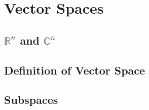 \chapter{Vector Spaces}

\section{$\mathbb{R}^{n}$ and $\mathbb{C}^{n}$}

\section{Definition of Vector Space}

\section{Subspaces}
